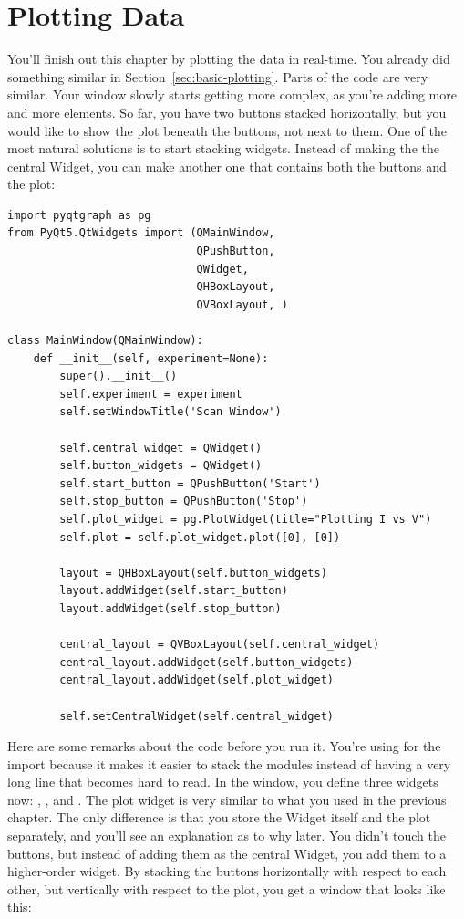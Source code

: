 

\section{Plotting Data}\label{sec:plotting-data}
You'll finish out this chapter by plotting the data in real-time. You already did something similar in Section~\ref{sec:basic-plotting}. Parts of the code are very similar. Your window slowly starts getting more complex, as you're adding more and more elements. So far, you have two buttons stacked horizontally, but you would like to show the plot beneath the buttons, not next to them. One of the most natural solutions is to start stacking widgets. Instead of making the  the central Widget, you can make another one that contains both the buttons and the plot:

\begin{verbatim}
import pyqtgraph as pg
from PyQt5.QtWidgets import (QMainWindow,
                             QPushButton,
                             QWidget,
                             QHBoxLayout,
                             QVBoxLayout, )

class MainWindow(QMainWindow):
    def __init__(self, experiment=None):
        super().__init__()
        self.experiment = experiment
        self.setWindowTitle('Scan Window')

        self.central_widget = QWidget()
        self.button_widgets = QWidget()
        self.start_button = QPushButton('Start')
        self.stop_button = QPushButton('Stop')
        self.plot_widget = pg.PlotWidget(title="Plotting I vs V")
        self.plot = self.plot_widget.plot([0], [0])

        layout = QHBoxLayout(self.button_widgets)
        layout.addWidget(self.start_button)
        layout.addWidget(self.stop_button)

        central_layout = QVBoxLayout(self.central_widget)
        central_layout.addWidget(self.button_widgets)
        central_layout.addWidget(self.plot_widget)

        self.setCentralWidget(self.central_widget)
\end{verbatim}

Here are some remarks about the code before you run it. You're using \py{()} for the import because it makes it easier to stack the modules instead of having a very long line that becomes hard to read. In the window, you define three widgets now: , , and . The plot widget is very similar to what you used in the previous chapter. The only difference is that you store the Widget itself and the plot separately, and you'll see an explanation as to why later. You didn't touch the buttons, but instead of adding them as the central Widget, you add them to a higher-order widget. By stacking the buttons horizontally with respect to each other, but vertically with respect to the plot, you get a window that looks like this:

